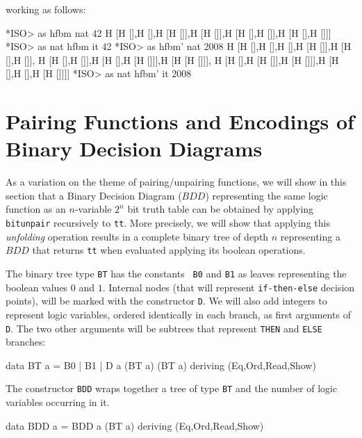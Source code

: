 \documentclass[]{INCLUDES/llncs}
\begin{document}
working as follows:
\begin{codex}
*ISO> as hfbm nat 42
H [H [],H [],H [H []],H [H []],H [H [],H []],H [H [],H []]]
*ISO> as nat hfbm it
42
*ISO> as hfbm' nat 2008
H [H [],H [],H [],H [H []],H [H [],H []],
   H [H [],H []],H [H [],H [H []]],H [H [H []]],
   H [H [],H [H []],H [H []]],H [H [],H [],H [H []]]]
*ISO> as nat hfbm' it
2008   
\end{codex}

\section{Pairing Functions and Encodings of Binary Decision Diagrams}
\label{encbdd}
As a variation on the theme of pairing/unpairing functions, we will show in this
section that a Binary Decision Diagram ($BDD$) 
representing the same logic function as an $n$-variable $2^n$ bit truth
table can be obtained by applying {\tt bitunpair} recursively to {\tt tt}.
More precisely, we will show that applying this {\em unfolding} operation
results in a complete binary tree of depth $n$ representing
a $BDD$ that returns {\tt tt} when evaluated applying
its boolean operations.

The binary tree type {\tt BT} has the constants {\tt
B0} and {\tt B1} as leaves representing the boolean values $0$ and $1$.
Internal nodes (that will represent {\tt if-then-else} decision points), 
will be marked with the constructor {\tt D}. 
We will also add integers to represent logic
variables, ordered identically in each
branch, as first arguments of {\tt D}. 
The two other arguments will be subtrees 
that represent {\tt THEN} 
and {\tt ELSE} branches:
\begin{code}
data BT a = B0 | B1 | D a (BT a) (BT a) 
             deriving (Eq,Ord,Read,Show)
\end{code}

The constructor {\tt BDD} wraps together a 
tree of type {\tt BT} and the number of logic
variables occurring in it.
\begin{code}
data BDD a = BDD a (BT a) deriving (Eq,Ord,Read,Show)
\end{code}
\end{document}
